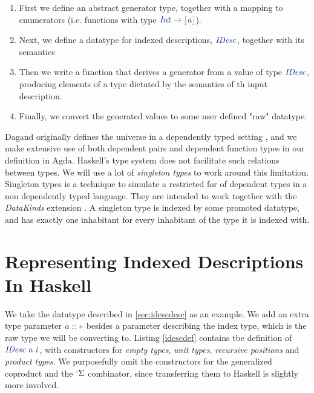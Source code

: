\documentclass[a4paper,msc,twosized=semi]{uustthesis}
\newcommand*{\mathcolor}{}
\def\mathcolor#1#{\mathcoloraux{#1}}
\newcommand*{\mathcoloraux}[3]{%
  \protect\leavevmode
  \begingroup
    \color#1{#2}#3%
  \endgroup
}
\newcommand{\HSSpecial}[1]{\mathcolor{hsblue4}{#1}}
\newcommand{\HSSym}[1]{\mathcolor{hsblue4}{#1}}
\newcommand{\HSCon}[1]{\mathcolor{hsblue3}{\mathit{#1}}}
\newcommand{\HSVar}[1]{\mathcolor{hsblue5}{\mathit{#1}}}
\begin{document}
  \begin{enumerate}
    \item 
      First we define an abstract generator type, together with a mapping to enumerators (i.e. functions with type \ensuremath{\HSCon{Int}\HSSym{\to} \HSSpecial{\HSSym{[\mskip1.5mu} }\HSVar{a}\HSSpecial{\HSSym{\mskip1.5mu]}}}). 

    \item 
      Next, we define a datatype for indexed descriptions, \ensuremath{\HSCon{IDesc}}, together with its semantics

    \item 
      Then we write a function that derives a generator from a value of type \ensuremath{\HSCon{IDesc}}, producing elements of a type dictated by the semantics of th input description. 

    \item 
      Finally, we convert the generated values to some user defined "raw" datatype.  
  \end{enumerate}

Dagand originally defines the universe in a dependently typed setting \cite{dagand2013cosmology}, and we make extensive use of both dependent pairs and dependent function types in our definition in Agda. Haskell's type system does not facilitate such relations between types. We will use a lot of \emph{singleton types} \cite{eisenberg2013dependently} to work around this limitation. Singleton types is a technique to simulate a restricted for of dependent types in a non dependently typed language. They are intended to work together with the \emph{DataKinds} extension \cite{ghcdocsdatakinds}. A singleton type is indexed by some promoted datatype, and has exactly one inhabitant for every inhabitant of the type it is indexed with.   

\section{Representing Indexed Descriptions In Haskell}

  We take the datatype described in \cref{sec:idescdesc} as an example. We add an extra type parameter \ensuremath{\HSVar{a}\HSSym{::}\HSSym{*}} besides a parameter describing the index type, which is the raw type we will be converting to. Listing \ref{idescdef} contains tbe definition of \ensuremath{\HSCon{IDesc}\;\HSVar{a}\;\HSVar{i}}, with constructors for \emph{empty types}, \emph{unit types}, \emph{recursive positions} and \emph{product types}. We purposefully omit the constructors for the generalized coproduct and the \ensuremath{\HSSpecial{`}\Sigma } combinator, since transferring them to Haskell is slightly more involved. 
\end{document}
